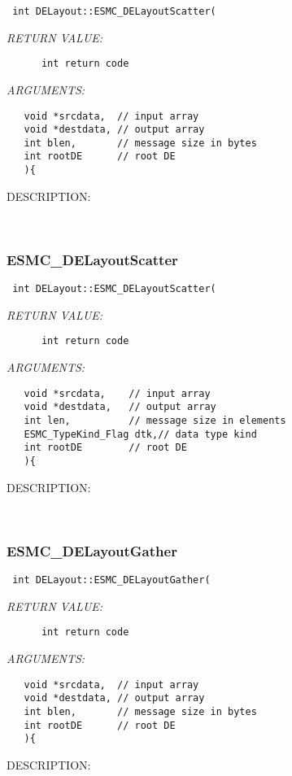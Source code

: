   
\begin{verbatim} int DELayout::ESMC_DELayoutScatter(\end{verbatim}{\em RETURN VALUE:}
\begin{verbatim}      int return code\end{verbatim}{\em ARGUMENTS:}
\begin{verbatim}   void *srcdata,  // input array
   void *destdata, // output array
   int blen,       // message size in bytes
   int rootDE      // root DE
   ){\end{verbatim}
{\sf DESCRIPTION:\\ }


   
 
\mbox{}\hrulefill\
 
\subsubsection [ESMC\_DELayoutScatter] {ESMC\_DELayoutScatter}


  
\begin{verbatim} int DELayout::ESMC_DELayoutScatter(\end{verbatim}{\em RETURN VALUE:}
\begin{verbatim}      int return code\end{verbatim}{\em ARGUMENTS:}
\begin{verbatim}   void *srcdata,    // input array
   void *destdata,   // output array
   int len,          // message size in elements
   ESMC_TypeKind_Flag dtk,// data type kind
   int rootDE        // root DE
   ){\end{verbatim}
{\sf DESCRIPTION:\\ }


   
 
\mbox{}\hrulefill\
 
\subsubsection [ESMC\_DELayoutGather] {ESMC\_DELayoutGather}


  
\begin{verbatim} int DELayout::ESMC_DELayoutGather(\end{verbatim}{\em RETURN VALUE:}
\begin{verbatim}      int return code\end{verbatim}{\em ARGUMENTS:}
\begin{verbatim}   void *srcdata,  // input array
   void *destdata, // output array
   int blen,       // message size in bytes
   int rootDE      // root DE
   ){\end{verbatim}
{\sf DESCRIPTION:\\ }



